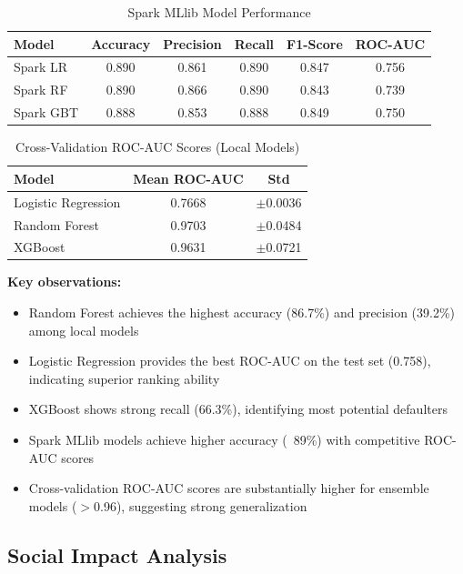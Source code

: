 \documentclass[preprint,12pt,authoryear]{elsarticle}
\begin{document}
\begin{table}[htbp]
\centering
\caption{Spark MLlib Model Performance}
\label{tab:spark_results}
\begin{tabular}{@{}lccccc@{}}
\toprule
Model & Accuracy & Precision & Recall & F1-Score & ROC-AUC \\
\midrule
Spark LR & 0.890 & 0.861 & 0.890 & 0.847 & 0.756 \\
Spark RF & 0.890 & 0.866 & 0.890 & 0.843 & 0.739 \\
Spark GBT & 0.888 & 0.853 & 0.888 & 0.849 & 0.750 \\
\bottomrule
\end{tabular}
\end{table}

\begin{table}[htbp]
\centering
\caption{Cross-Validation ROC-AUC Scores (Local Models)}
\label{tab:cv_results}
\begin{tabular}{@{}lcc@{}}
\toprule
Model & Mean ROC-AUC & Std \\
\midrule
Logistic Regression & 0.7668 & $\pm$0.0036 \\
Random Forest & 0.9703 & $\pm$0.0484 \\
XGBoost & 0.9631 & $\pm$0.0721 \\
\bottomrule
\end{tabular}
\end{table}

\textbf{Key observations:}
\begin{itemize}
    \item Random Forest achieves the highest accuracy (86.7\%) and precision (39.2\%) among local models
    \item Logistic Regression provides the best ROC-AUC on the test set (0.758), indicating superior ranking ability
    \item XGBoost shows strong recall (66.3\%), identifying most potential defaulters
    \item Spark MLlib models achieve higher accuracy (~89\%) with competitive ROC-AUC scores
    \item Cross-validation ROC-AUC scores are substantially higher for ensemble models ($>$0.96), suggesting strong generalization
\end{itemize}

\subsection{Social Impact Analysis}
\end{document}
